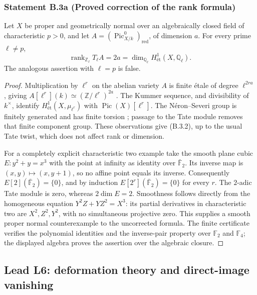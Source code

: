 \subsubsection*{Statement B.3a (Proved correction of the rank formula)}
Let $X$ be proper and geometrically normal over an algebraically
closed field of characteristic $p>0$, and let
$A=(\operatorname{Pic}^{0}_{X/k})_{\mathrm{red}}$, of dimension
$a$.  For every prime $\ell\ne p$,
\[
 \operatorname{rank}_{\mathbb Z_\ell}T_\ell A
 =2a
 =\dim_{\mathbb Q_\ell}H^1_{\text{ét}}
       (X,\mathbb Q_\ell).
 \tag{B.3.2}
\]
The analogous assertion with $\ell=p$ is false.
\begin{proof}
Multiplication by $\ell^r$ on the abelian variety $A$ is finite
\'etale of degree $\ell^{2ra}$, giving
$A[\ell^r](k)\simeq(\mathbb Z/\ell^r)^{2a}$
\cite[Tag 03RP]{StacksB}.  The Kummer
sequence, and divisibility of $k^\times$, identify
$H^1_{\text{ét}}(X,\mu_{\ell^r})$ with
$\operatorname{Pic}(X)[\ell^r]$.  The N\'eron--Severi group is
finitely generated and has finite torsion
\cite[Remark 6.19]{Kleiman2005}; passage to the
Tate module removes that finite component group.  These
observations give (B.3.2), up to the usual Tate twist, which
does not affect rank or dimension.

For a completely explicit characteristic two example take
the smooth plane cubic
$E: y^2+y=x^3$ with the point at infinity as identity over
$\bar{\mathbb F}_2$.  Its inverse map is
$(x,y)\mapsto(x,y+1)$, so no affine point equals its inverse.
Consequently $E[2](\bar{\mathbb F}_2)=\{0\}$, and by induction
$E[2^r](\bar{\mathbb F}_2)=\{0\}$ for every $r$.
The $2$-adic Tate module is zero, whereas $2\dim E=2$.
Smoothness follows directly from the homogeneous equation
$Y^2Z+YZ^2=X^3$: its partial derivatives in characteristic
two are $X^2,Z^2,Y^2$, with no simultaneous projective zero.
This supplies a smooth proper normal counterexample to the
uncorrected formula.  The finite certificate verifies the
polynomial identities and the inverse-pair property over
$\mathbb F_2$ and $\mathbb F_4$; the displayed algebra proves
the assertion over the algebraic closure.
\end{proof}

\subsection{Lead L6: deformation theory and direct-image vanishing}

